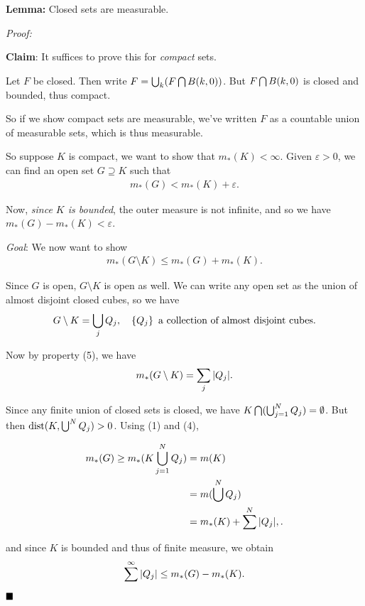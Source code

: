 \textbf{Lemma:} Closed sets are measurable.

\emph{Proof:}

\textbf{Claim}: It suffices to prove this for \emph{compact} sets.

Let \(F\) be closed. Then write \(F = \bigcup_k (F \bigcap B(k, 0))\).
But \(F\bigcap B(k, 0)\) is closed and bounded, thus compact.

So if we show compact sets are measurable, we've written \(F\) as a
countable union of measurable sets, which is thus measurable.

So suppose \(K\) is compact, we want to show that \(m_*(K) < \infty\).
Given \(\varepsilon > 0\), we can find an open set \(G \supseteq K\)
such that
\begin{align*}
m_*(G) < m_*(K) + \varepsilon
.\end{align*}

Now, \emph{since \(K\) is bounded}, the outer measure is not infinite,
and so we have \(m_*(G) - m_*(K) < \varepsilon\).

\emph{Goal}: We now want to show
\begin{align*}
m_*(G\setminus K) \leq m_*(G) + m_*(K)
.\end{align*}

Since \(G\) is open, \(G\setminus K\) is open as well. We can write any
open set as the union of almost disjoint closed cubes, so we have
\begin{align*}
G\setminus K = \bigcup_j Q_j,\quad \left\{{Q_j}\right\} \text{ a collection of almost disjoint cubes.}
\end{align*}

Now by property (5), we have
\begin{align*}
m_*(G\setminus K) = \sum_j {\left\lvert {Q_j} \right\rvert}
.\end{align*}

Since any finite union of closed sets is closed, we have
\(K \bigcap (\bigcup_{j=1}^N Q_j) = \emptyset\). But then
\(\mathrm{dist}(K, \bigcup^N Q_j) > 0\). Using (1) and (4),

\begin{align*}
m_*(G) \geq m_*(K \bigcup_{j=1}^N Q_j) &= m(K) \\
&= m(\bigcup^N Q_j) \\
&= m_*(K) + \sum^N {\left\lvert {Q_j} \right\rvert},
.\end{align*}

and since \(K\) is bounded and thus of finite measure, we obtain
\begin{align*}
\sum^\infty {\left\lvert {Q_j} \right\rvert} \leq m_*(G) - m_*(K).
\end{align*} \(\qed\)

